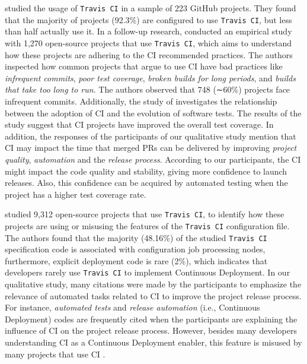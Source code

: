 \cite{Vasilescu2015-tj} studied the usage of
\texttt{Travis CI} in a sample of 223 GitHub projects.
They found that the majority of projects (92.3\%) are configured to use
\texttt{Travis CI}, but less than half actually use it. In a follow-up research, \cite{felidre2019continuous} conducted an empirical study with 1,270 open-source projects that use \texttt{Travis CI}, which aims to understand how these projects are adhering to the CI recommended practices. The authors inspected how common projects that argue to use CI have bad practices like \textit{infrequent commits}, \textit{poor test coverage}, \textit{broken builds for long periods}, and \textit{builds that take too long to run}. The authors observed that 748 (∼60\%) projects face infrequent commits. 
Additionally, the study of \cite{nery2019empirical} investigates the relationship between the adoption of CI and the evolution of software tests. 
The results of the study suggest that CI projects have improved the overall test coverage.
In addition, the responses of the participants of our qualitative study mention that CI may impact the time that merged PRs can be delivered by improving \textit{project quality}, \textit{automation} and the \textit{release process}. According to our participants, the CI might impact the code quality and stability, giving more confidence to launch releases. Also, this confidence can be acquired by automated testing when the project has a higher test coverage rate.

\cite{gallaba2018use} studied 9,312 open-source projects that use \texttt{Travis CI}, to identify how these projects are using or misusing the features of the \texttt{Travis CI} configuration file. The authors found that the majority (48.16\%) of the studied \texttt{Travis CI} specification code is associated with configuration job processing nodes, furthermore, explicit deployment code is rare (2\%), which indicates that developers rarely use \texttt{Travis CI} to implement Continuous Deployment. In our qualitative study, many citations were made by the participants to emphasize the relevance of automated tasks related to CI to improve the project release process. For instance, \textit{automated tests} and \textit{release automation} (i.e., Continuous Deployment) codes are frequently cited when the participants are explaining the influence of CI on the project release process. However, besides many developers understanding CI as a Continuous Deployment enabler, this feature is misused by many projects that use CI \citep{gallaba2018use}.

